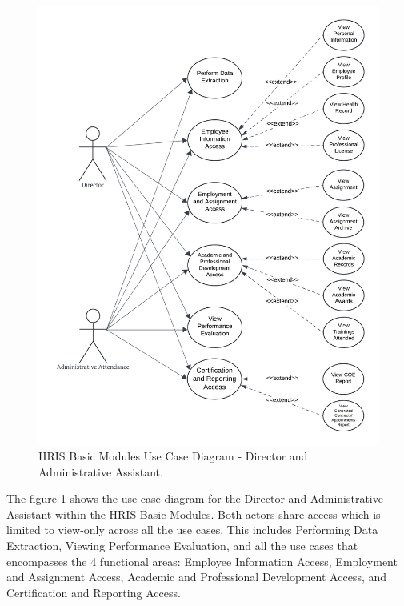    \begin{figure}[H] 
        \centering
        \includegraphics[width=0.9\linewidth]{figures/images/diagrams/usecase/use-case-basic-3.png}
        \caption{HRIS Basic Modules Use Case Diagram - Director and Administrative Assistant.}
        \label{fig:use-case-basic-3}
    \end{figure}

    The figure \ref{fig:use-case-basic-3} shows the use case diagram for the Director and Administrative Assistant within the HRIS Basic Modules. Both actors share access which is limited to view-only across all the use cases. This includes Performing Data Extraction, Viewing Performance Evaluation, and all the use cases that encompasses the 4 functional areas: Employee Information Access, Employment and Assignment Access, Academic and Professional Development Access, and Certification and Reporting Access. 

